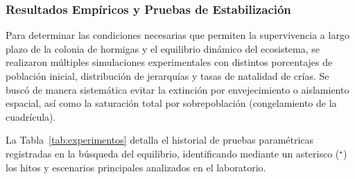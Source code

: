 \documentclass[12pt,a4paper]{article}
\begin{document}
\subsubsection{Resultados Empíricos y Pruebas de Estabilización}
Para determinar las condiciones necesarias que permiten la supervivencia a largo plazo de la colonia de hormigas y el equilibrio dinámico del ecosistema, se realizaron múltiples simulaciones experimentales con distintos porcentajes de población inicial, distribución de jerarquías y tasas de natalidad de crías. Se buscó de manera sistemática evitar la extinción por envejecimiento o aislamiento espacial, así como la saturación total por sobrepoblación (congelamiento de la cuadrícula).

La Tabla~\ref{tab:experimentos} detalla el historial de pruebas paramétricas registradas en la búsqueda del equilibrio, identificando mediante un asterisco ($^\star$) los hitos y escenarios principales analizados en el laboratorio.
\end{document}
